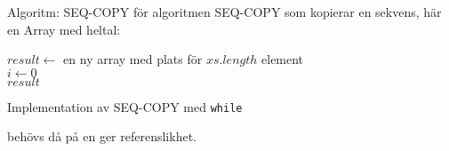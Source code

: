 \begin{Slide}{Algoritm: SEQ-COPY}
 för algoritmen SEQ-COPY som kopierar en sekvens, här en Array med heltal:\\
\noindent\hrulefill
\begin{algorithm}[H]
$result \leftarrow$ en ny array med plats för $xs.length$ element\\
$i \leftarrow 0$  \\
$result$
\end{algorithm}
\noindent\hrulefill
\end{Slide}

\begin{Slide}{Implementation av SEQ-COPY med \texttt{while}}

 behövs då \code{==} på en  ger referenslikhet.
\end{Slide}

% 
%
% 
